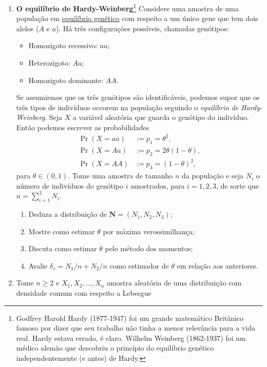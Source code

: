 \documentclass[a4paper,10pt, notitlepage]{report}
\newcommand{\pr}{\operatorname{Pr}} %
\newcommand{\rs}{X_1, X_2, \ldots, X_n} %
\begin{document}
\begin{enumerate}  
    \item \textbf{O equilíbrio de Hardy-Weinberg}\footnote{Godfrey Harold Hardy (1877-1947) foi um grande matemático Britânico famoso por dizer que seu trabalho não tinha a menor relevância para a vida real. Hardy estava errado, é claro. Wilhelm Weinberg (1862-1937) foi um médico alemão que descobriu o princípio do equilíbrio genético independentemente (e antes) de Hardy.}
    Considere uma amostra de uma população em \underline{equilíbrio genético} com respeito a um único gene que tem dois alelos ($A$ e $a$).
   Há três configurações possíveis, chamadas genótipos:
    \begin{itemize}
        \item Homozigoto recessivo: $aa$;
        \item Heterozigoto: $Aa$;
        \item Homozigoto dominante: $AA$.
    \end{itemize}
     Se assumirmos que os três genótipos são identificáveis, podemos supor que os três tipos de indivíduos occorem na população seguindo o \textit{equilíbrio de Hardy-Weinberg}.
     Seja $X$ a variável aleatória que guarda o genótipo do indivíduo.
     Então podemos escrever as probabilidades
     \begin{align*}
         \pr(X = aa) &:= p_1 = \theta^2,\\
         \pr(X = Aa) &:= p_2 = 2\theta(1-\theta),\\
         \pr(X = AA) &:= p_3 = (1-\theta)^2,
     \end{align*}
     para $\theta \in (0, 1)$.
     Tome uma amostra de tamanho $n$ da população e seja $N_i$ o número de indivíduos do genótipo $i$ amostrados, para $i = 1, 2, 3$, de sorte que $n = \sum_{i=1}^3 N_i$.
     \begin{enumerate}
         \item Deduza a distribuição de $\boldsymbol{N} = (N_1, N_2, N_3)$;
         \item Mostre como estimar $\theta$ por máxima verossimilhança;
         \item Discuta como estimar $\theta$ pelo método dos momentos;
         \item Avalie $\delta_s = N_1/n + N_2/n$ como estimador de $\theta$ em relação aos anteriores.
     \end{enumerate}
    \item Tome $n\geq 2$ e $\rs$ amostra aleatória de uma distribuição com densidade comum com respeito a Lebesgue

\end{enumerate}
\end{document}

